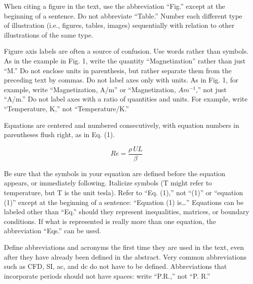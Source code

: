 When citing a figure in the text, use the abbreviation “Fig.” except at the beginning of a sentence. Do not abbreviate “Table.” Number each different type of illustration (i.e., figures, tables, images) sequentially with relation to other illustrations of the same type.

Figure axis labels are often a source of confusion. Use words rather than symbols. As in the example in Fig. 1, write the quantity “Magnetization” rather than just “M.” Do not enclose units in parenthesis, but rather separate them from the preceding text by commas. Do not label axes only with units. As in Fig. 1, for example, write “Magnetization, A/m” or “Magnetization, $Am^{-1}$,” not just “A/m.” Do not label axes with a ratio of quantities and units. For example, write “Temperature, K,” not “Temperature/K.”

Equations are centered and numbered consecutively, with equation numbers in parentheses flush right, as in Eq. (1). 

\begin{equation}
    \label{simple_equation} %
    Re = \frac{\rho\,UL}{\beta} %
\end{equation}

Be sure that the symbols in your equation are defined before the equation appears, or immediately following. Italicize symbols (T might refer to temperature, but T is the unit tesla). Refer to “Eq. (1),” not “(1)” or “equation (1)” except at the beginning of a sentence: “Equation (1) is…” Equations can be labeled other than “Eq.” should they represent inequalities, matrices, or boundary conditions. If what is represented is really more than one equation, the abbreviation “Eqs.” can be used.

Define abbreviations and acronyms the first time they are used in the text, even after they have already been defined in the abstract. Very common abbreviations such as CFD, SI, ac, and dc do not have to be defined. Abbreviations that incorporate periods should not have spaces: write “P.R.,” not “P. R.” 